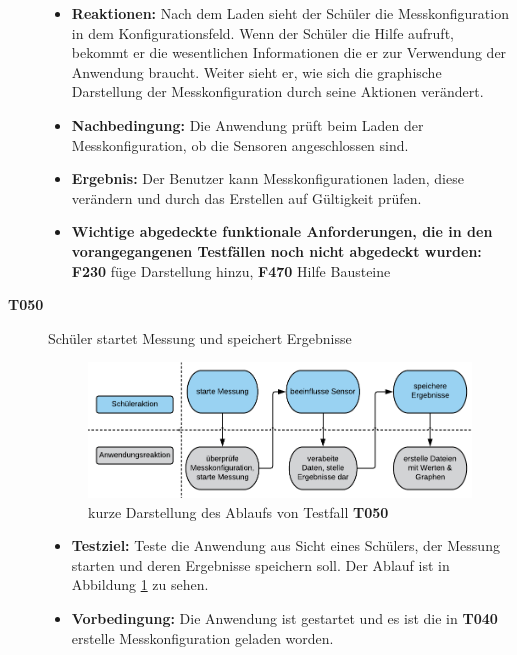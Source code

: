 \documentclass[parskip=full]{scrartcl}
\begin{document}
\begin{description}
\begin{itemize}
\item []\textbf{Reaktionen:} Nach dem Laden sieht der Schüler die Messkonfiguration in dem Konfigurationsfeld. Wenn der Schüler die Hilfe aufruft, bekommt er die wesentlichen Informationen die er zur Verwendung der Anwendung braucht. Weiter sieht er, wie sich die graphische Darstellung der Messkonfiguration durch seine Aktionen verändert. 
\item []\textbf{Nachbedingung:} Die Anwendung prüft beim Laden der Messkonfiguration, ob die Sensoren angeschlossen sind. 


\item []\textbf{Ergebnis:} Der Benutzer kann Messkonfigurationen laden, diese verändern und durch das Erstellen auf Gültigkeit prüfen. 
\item []\textbf{Wichtige abgedeckte funktionale Anforderungen, die in den vorangegangenen Testfällen noch nicht abgedeckt wurden:} \textbf{F230} füge Darstellung hinzu, \textbf{F470} Hilfe Bausteine

\end{itemize}

\item[\textbf{T050}] Schüler startet Messung und speichert Ergebnisse

\begin{figure}[htbp]
	\begin{center}
		\includegraphics[width = 13cm]{Grafik/T050-Ablauf.png}
		\caption{kurze Darstellung des Ablaufs von Testfall \textbf{T050}}
		\label{T050-Ablauf}
	\end{center}
\end{figure}
\begin{itemize}

\item []\textbf{Testziel:} Teste die Anwendung aus Sicht eines Schülers, der Messung starten und deren Ergebnisse speichern soll. Der Ablauf ist in Abbildung \ref{T050-Ablauf} zu sehen.

\item []\textbf{Vorbedingung:} Die Anwendung ist gestartet und es ist die in \textbf{T040} erstelle Messkonfiguration geladen worden.


\end{itemize}
\end{description}
\end{document}
